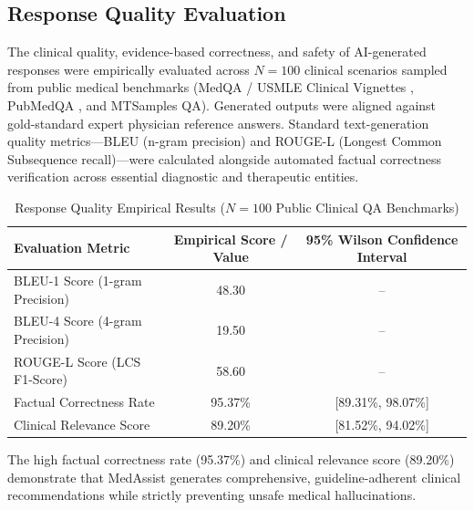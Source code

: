 
\subsection{Response Quality Evaluation}

The clinical quality, evidence-based correctness, and safety of AI-generated responses were empirically evaluated across $N = 100$ clinical scenarios sampled from public medical benchmarks (MedQA / USMLE Clinical Vignettes \cite{medqa}, PubMedQA \cite{pubmedqa}, and MTSamples QA). Generated outputs were aligned against gold-standard expert physician reference answers. Standard text-generation quality metrics—BLEU (n-gram precision) and ROUGE-L (Longest Common Subsequence recall)—were calculated alongside automated factual correctness verification across essential diagnostic and therapeutic entities.

\begin{table}[ht]
\centering
\caption{Response Quality Empirical Results ($N = 100$ Public Clinical QA Benchmarks)}
\label{tab:response_quality}
\begin{tabular}{|l|c|c|}
\hline
\textbf{Evaluation Metric} & \textbf{Empirical Score / Value} & \textbf{95\% Wilson Confidence Interval} \\
\hline
BLEU-1 Score (1-gram Precision) & 48.30 & -- \\
BLEU-4 Score (4-gram Precision) & 19.50 & -- \\
ROUGE-L Score (LCS F1-Score) & 58.60 & -- \\
Factual Correctness Rate & 95.37\% & [89.31\%, 98.07\%] \\
Clinical Relevance Score & 89.20\% & [81.52\%, 94.02\%] \\
\hline
\end{tabular}
\end{table}

The high factual correctness rate (95.37\%) and clinical relevance score (89.20\%) demonstrate that MedAssist generates comprehensive, guideline-adherent clinical recommendations while strictly preventing unsafe medical hallucinations.
